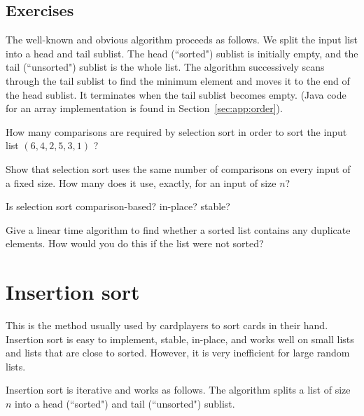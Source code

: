 \subsection*{Exercises}

\begin{Exercise}\label{exr:selection-sort-do} 
The  well-known and obvious  algorithm 
proceeds as follows.
We split the input list into a head and tail sublist. The head (``sorted") sublist is 
initially empty, and the tail (``unsorted") sublist is the whole list. 
The algorithm successively scans through the tail sublist to find the minimum 
element and moves it to the end of the head sublist. It terminates when the 
tail sublist becomes empty. (Java code for an array implementation is found 
in Section~\ref{sec:app:order}).

How many comparisons are required by selection sort in order to sort the input list 
$(6,4,2,5,3,1)$ ?  
\end{Exercise}

\begin{Exercise}\label{exr:selectionsort}
Show that selection sort uses the same number of comparisons on every input of 
a fixed size. How many does it use, exactly, for an input of size $n$? 
\end{Exercise}

\begin{Exercise}\label{exr:selsort-attributes}
Is selection sort comparison-based? in-place? stable?
\end{Exercise}

\begin{Exercise}\label{exr:find-duplicates}
Give a linear time algorithm to find whether a sorted list contains any 
duplicate elements. How would you do this if the list were not 
sorted?
\end{Exercise}

\section{Insertion sort}\label{sec:insort}

This is the method usually used by cardplayers to sort cards in their hand. 
Insertion sort is easy to implement, stable, in-place, and works well on small 
lists and lists that are close to sorted. However, it is very inefficient for 
large random lists.

Insertion sort is iterative and works as follows. The algorithm splits a list 
of size \(n\) into a head (``sorted") and tail (``unsorted") sublist.

